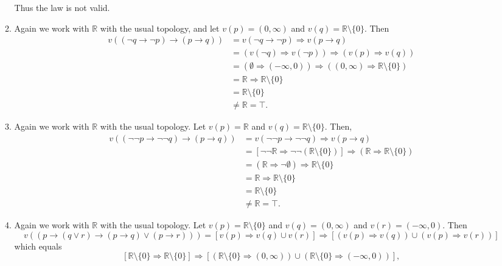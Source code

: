 \documentclass{article}
\theoremstyle{plain}
\begin{document}
\begin{enumerate}
\begin{enumerate}
			Thus the law is not valid.
			\item Again we work with $\mathbb{R}$ with the usual topology, and let $v(p) = (0,\infty)$ and $v(q) = \mathbb{R}\setminus\{0\}$. Then
			\begin{align*}
				v((\neg q \rightarrow \neg p) \rightarrow (p\rightarrow q)) &= v(\neg q \rightarrow \neg p) \Rightarrow 	v(p\rightarrow q)\\
				&= (v(\neg q) \Rightarrow v(\neg p)) \Rightarrow (v(p) \Rightarrow v(q))\\
				&= (\emptyset \Rightarrow (-\infty,0)) \Rightarrow ((0,\infty) \Rightarrow \mathbb{R}\setminus \{0\})\\
				&= \mathbb{R} \Rightarrow \mathbb{R}\setminus \{0\}\\
				&= \mathbb{R}\setminus \{0\}\\
				&\neq \mathbb{R} = \top.		
			\end{align*}
			\item Again we work with $\mathbb{R}$ with the usual topology. Let $v(p)= \mathbb{R}$ and $v(q) = \mathbb{R}\setminus\{0\}$. Then,
			\begin{align*}
				v((\neg\neg p \rightarrow \neg\neg q) \rightarrow (p\rightarrow q)) &= v(\neg\neg p \rightarrow \neg\neg q)\Rightarrow v(p\rightarrow q)\\
				&= [\neg\neg\mathbb{R} \Rightarrow \neg\neg(\mathbb{R}\setminus\{0\})] \Rightarrow (\mathbb{R} \Rightarrow \mathbb{R}\setminus\{0\})\\
				&=(\mathbb{R} \Rightarrow \neg\emptyset)\Rightarrow \mathbb{R}\setminus\{0\}\\
				&= \mathbb{R}\Rightarrow \mathbb{R}\setminus \{0\}\\
				&= \mathbb{R}\setminus \{0\}\\
				&\neq \mathbb{R} = \top.
			\end{align*}
			\item Again we work with $\mathbb{R}$ with the usual topology. Let $v(p)= \mathbb{R}\setminus \{0\}$ and $v(q) = (0,\infty)$ and $v(r) = (-\infty, 0)$. Then
			\begin{equation*}
				v((p\rightarrow(q\vee r) \rightarrow (p\rightarrow q) \vee (p\rightarrow r))) = [v(p)\Rightarrow v(q)\cup v(r)]\Rightarrow [(v(p)\Rightarrow v(q)) \cup (v(p)\Rightarrow v(r))]
			\end{equation*}
			which equals
			\[
				[\mathbb{R}\setminus\{0\} \Rightarrow \mathbb{R}\setminus\{0\}]\Rightarrow [(\mathbb{R}\setminus\{0\} \Rightarrow (0,\infty)) \cup (\mathbb{R}\setminus\{0\} \Rightarrow (-\infty,0))],
\]
\end{enumerate}
\end{enumerate}
\end{document}
